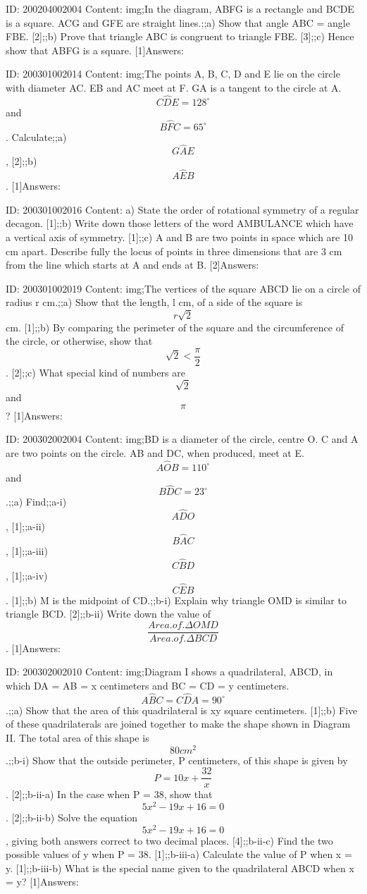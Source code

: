 \documentclass{article}
\begin{document}
ID: 200204002004
Content:
img;In the diagram, ABFG is a rectangle and BCDE is a square. ACG and GFE are straight lines.;;a) Show that angle ABC = angle FBE.   [2];;b) Prove that triangle ABC is congruent to triangle FBE.   [3];;c) Hence show that ABFG is a square.   [1]Answers:

ID: 200301002014
Content:
img;The points A, B, C, D and E lie on the circle with diameter AC. EB and AC meet at F. GA is a tangent to the circle at A. $$C \hat DE = 128^{\circ}$$ and $$B \hat FC = 65^{\circ}$$. Calculate;;a) $$G \hat AE$$, [2];;b) $$A \hat EB$$. [1]Answers:

ID: 200301002016
Content:
a) State the order of rotational symmetry of a regular decagon. [1];;b) Write down those letters of the word AMBULANCE which have a vertical axis of symmetry. [1];;c) A and B are two points in space which are 10 cm apart. Describe fully the locus of points in three dimensions that are 3 cm from the line which starts at A and ends at B. [2]Answers:

ID: 200301002019
Content:
img;The vertices of the square ABCD lie on a circle of radius r cm.;;a) Show that the length, l cm, of a side of the square is $$r \sqrt{2}$$ cm. [1];;b) By comparing the perimeter of the square and the circumference of the circle, or otherwise, show that $$\sqrt{2} < \frac{\pi}{2}$$. [2];;c) What special kind of numbers are $$\sqrt{2}$$ and $$\pi$$? [1]Answers:

ID: 200302002004
Content:
img;BD is a diameter of the circle, centre O. C and A are two points on the circle. AB and DC, when produced, meet at E. $$A \hat OB=110^{\circ}$$ and $$B \hat DC=23^{\circ}$$.;;a) Find;;a-i) $$A \hat DO$$, [1];;a-ii) $$B \hat AC$$, [1];;a-iii) $$C \hat BD$$, [1];;a-iv) $$C \hat EB$$. [1];;b) M is the midpoint of CD.;;b-i) Explain why triangle OMD is similar to triangle BCD. [2];;b-ii) Write down the value of $$\frac{Area.of.\Delta OMD}{Area.of.\Delta BCD}$$. [1]Answers:

ID: 200302002010
Content:
img;Diagram I shows a quadrilateral, ABCD, in which DA = AB = x centimeters and BC = CD = y centimeters. $$A \hat BC=C \hat DA=90^{\circ}$$.;;a) Show that the area of this quadrilateral is xy square centimeters. [1];;b) Five of these quadrilaterals are joined together to make the shape shown in Diagram II. The total area of this shape is $$80 cm^{2} $$.;;b-i) Show that the outside perimeter, P centimeters, of this shape is given by $$P=10x+\frac{32}{x}$$. [2];;b-ii-a) In the case when P = 38, show that $$5x^{2} -19x+16=0$$. [2];;b-ii-b) Solve the equation $$5x^{2} -19x+16=0$$, giving both answers correct to two decimal places. [4];;b-ii-c) Find the two possible values of y when P = 38. [1];;b-iii-a) Calculate the value of P when x = y. [1];;b-iii-b) What is the special name given to the quadrilateral ABCD when x = y? [1]Answers:
\end{document}
